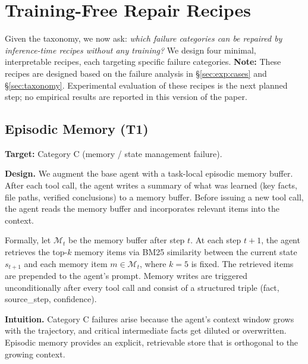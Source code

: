 \section{Training-Free Repair Recipes}
\label{sec:recipes}

Given the taxonomy, we now ask: \emph{which failure categories can be repaired by inference-time recipes without any training?} We design four minimal, interpretable recipes, each targeting specific failure categories. \textbf{Note:} These recipes are designed based on the failure analysis in \S\ref{sec:exp:cases} and \S\ref{sec:taxonomy}. Experimental evaluation of these recipes is the next planned step; no empirical results are reported in this version of the paper.


\subsection{Episodic Memory (T1)}
\label{sec:recipes:memory}


\textbf{Target:} Category C (memory / state management failure).

\textbf{Design.} We augment the base agent with a task-local episodic memory buffer. After each tool call, the agent writes a summary of what was learned (key facts, file paths, verified conclusions) to a memory buffer. Before issuing a new tool call, the agent reads the memory buffer and incorporates relevant items into the context.

Formally, let $\mathcal{M}_t$ be the memory buffer after step $t$. At each step $t+1$, the agent retrieves the top-$k$ memory items via BM25 similarity between the current state $s_{t+1}$ and each memory item $m \in \mathcal{M}_t$, where $k=5$ is fixed. The retrieved items are prepended to the agent's prompt. Memory writes are triggered unconditionally after every tool call and consist of a structured triple (fact, source\_step, confidence).

\textbf{Intuition.} Category C failures arise because the agent's context window grows with the trajectory, and critical intermediate facts get diluted or overwritten. Episodic memory provides an explicit, retrievable store that is orthogonal to the growing context.


